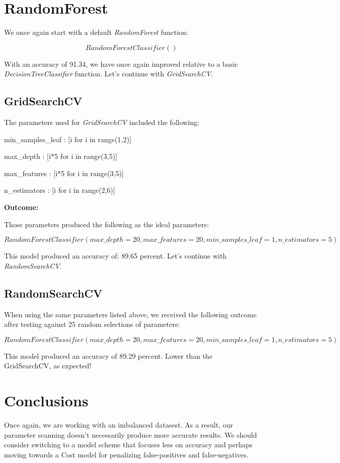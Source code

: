 \documentclass[notitlepage]{report}
\begin{document}
\section*{RandomForest}
We once again start with a default \textit{RandomForest} function:

$$
RandomForestClassifier()
$$

With an accuracy of 91.34, we have once again improved relative to a basic \textit{DecisionTreeClassifier} function. Let's continue with \textit{GridSearchCV}.

\subsection*{GridSearchCV}
The parameters used for \textit{GridSearchCV} included the following:

\qquad min\_samples\_leaf : [i for i in range(1,2)]

\qquad max\_depth : [i*5 for i in range(3,5)]

\qquad max\_features : [i*5 for i in range(3,5)]

\qquad n\_estimators : [i for i in range(2,6)]

\textbf{Outcome:}

Those parameters produced the following as the ideal parameters:

$$
RandomForestClassifier(max\_depth=20,max\_features=20,min\_samples\_leaf=1,n\_estimators=5)
$$

This model produced an accuracy of: 89.65 percent. Let's continue with \textit{RandomSearchCV}.

\subsection*{RandomSearchCV}
When using the same parameters listed above, we received the following outcome after testing against 25 random selections of parameters:

$$
RandomForestClassifier(max\_depth=20,max\_features=20,min\_samples\_leaf=1,n\_estimators=5)
$$

This model produced an accuracy of 89.29 percent. Lower than the GridSearchCV, as expected!

\section*{Conclusions}
Once again, we are working with an imbalanced datasest. As a result, our parameter scanning doesn't necessarily produce more accurate results. We should consider switching to a model scheme that focuses less on accuracy and perhaps moving towards a Cost model for penalizing false-positives and false-negatives.
\end{document}
